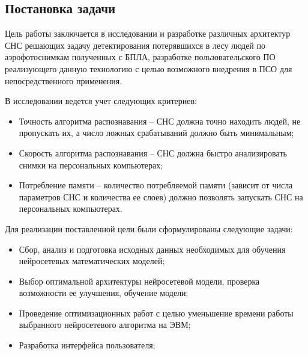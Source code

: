 \subsection{Постановка задачи}

Цель работы заключается в исследовании и разработке различных архитектур СНС решающих задачу детектирования потерявшихся в лесу людей по аэрофотоснимкам полученных с БПЛА, разработке пользовательского ПО реализующего данную технологию с целью возможного внедрения в ПСО для непосредственного применения.

В исследовании ведется учет следующих критериев:
\begin{itemize}
    \item Точность алгоритма распознавания -- СНС должна точно находить людей, не пропускать их, а число ложных срабатываний должно быть минимальным;
    \item Скорость алгоритма распознавания -- СНС должна быстро анализировать снимки на персональных компьютерах;
    \item Потребление памяти -- количество потребляемой памяти (зависит от числа параметров СНС и количества ее слоев) должно позволять запускать СНС на персональных компьютерах.
\end{itemize}

Для реализации поставленной цели были сформулированы следующие задачи:
\begin{itemize}
    \item Сбор, анализ и подготовка исходных данных необходимых для обучения нейросетевых математических моделей;
    \item Выбор оптимальной архитектуры нейросетевой модели, проверка возможности ее улучшения, обучение модели;
    \item Проведение оптимизационных работ с целью уменьшение времени работы выбранного нейросетевого алгоритма на ЭВМ;
    \item Разработка интерфейса пользователя;
\end{itemize}